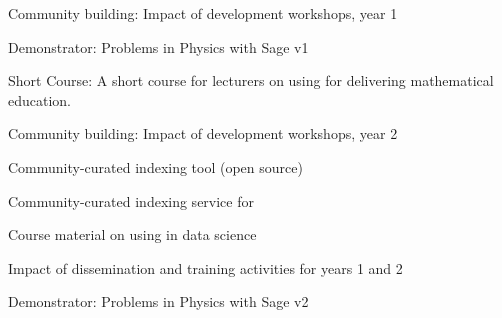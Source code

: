 \begin{workpackage}

\begin{wpdelivs}
 \begin{wpdeliv}[due=12,id=workshops-1,dissem=PU,nature=R]{Community building: Impact of development workshops, year 1}\end{wpdeliv}
  \begin{wpdeliv}[due=12,id=ibook3a,dissem=PU,nature=DEM]{Demonstrator: Problems in Physics with Sage v1} \end{wpdeliv}
   \begin{wpdeliv}[due=18,id=short-course,dissem=PU,nature=DEC,lead=USH]{Short Course: A short course for lecturers on using \TheProject for delivering mathematical education.}\end{wpdeliv}
\begin{wpdeliv}[due=24,id=workshops-2,dissem=PU,nature=R]{Community building: Impact of development workshops, year 2}\end{wpdeliv}  
\begin{wpdeliv}[due=24,id=ils-tool,dissem=PU,nature=P,lead=UV]{Community-curated
     indexing tool (open source)} \end{wpdeliv}
      \begin{wpdeliv}[due=24,id=ils-service,dissem=PU,nature=DEM,lead=UV]{Community-curated
     indexing service for \TheProject} \end{wpdeliv}
      \begin{wpdeliv}[due=24,id=datascience-course,dissem=PU,nature=DEC,lead=USH]{Course material on using \TheProject in data science} \end{wpdeliv}
  \begin{wpdeliv}[due=24,id=dissem-1,dissem=PU,nature=R]{Impact of dissemination and training activities for years 1 and 2}\end{wpdeliv}  
   \begin{wpdeliv}[due=30,id=ibook3b,dissem=PU,nature=DEM]{Demonstrator: Problems in Physics with Sage v2} \end{wpdeliv}

\end{wpdelivs}
\end{workpackage}
